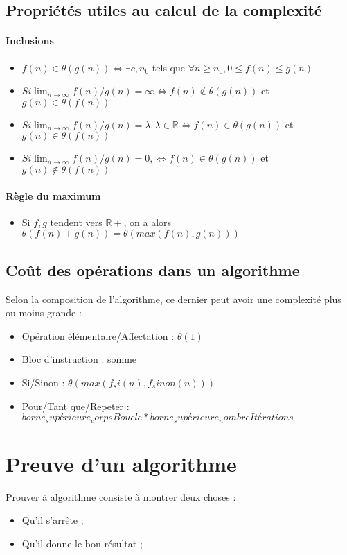 \documentclass{report}
\begin{document}
\subsection{Propriétés utiles au calcul de la complexité}
\paragraph{Inclusions}
\begin{itemize}
\item{$f(n) \in \theta(g(n)) \Leftrightarrow \exists c, n_0$ tels que $\forall n \geq n_0, 0 \leq f(n) \leq g(n)$}
\item{$Si \lim_{n \to \infty} f(n)/g(n) = \infty \Leftrightarrow f(n) \notin \theta(g(n))$ et $g(n) \in \theta(f(n)) $}
\item{$Si \lim_{n \to \infty} f(n)/g(n) = \lambda, \lambda \in \mathbb{R} \Leftrightarrow f(n) \in \theta(g(n))$ et $g(n) \in \theta(f(n)) $}
\item{$Si \lim_{n \to \infty} f(n)/g(n) = 0, \Leftrightarrow f(n) \in \theta(g(n))$ et $g(n) \notin \theta(f(n)) $}
\end{itemize}
\paragraph{Règle du maximum}
\begin{itemize}
\item{Si $f,g$ tendent vers $\mathbb{R+}$, on a alors $\theta(f(n)+g(n)) = \theta(max(f(n),g(n)))$}
\end{itemize}

\subsection{Coût des opérations dans un algorithme}
Selon la composition de l'algorithme, ce dernier peut avoir une complexité plus ou moins grande :
\begin{itemize}
    \item{Opération élémentaire/Affectation : $\theta(1)$}
    \item{Bloc d'instruction : somme}
    \item{Si/Sinon : $\theta(max(f_si(n), f_sinon(n)))$}
    \item{Pour/Tant que/Repeter : $borne_supérieure_corpsBoucle * borne_supérieure_nombreItérations$}
\end{itemize}


\section{Preuve d'un algorithme}
Prouver à algorithme consiste à montrer deux choses :
\begin{itemize}
    \item{Qu'il s'arrête ;}
    \item{Qu'il donne le bon résultat ;}
\end{itemize}
\end{document}
